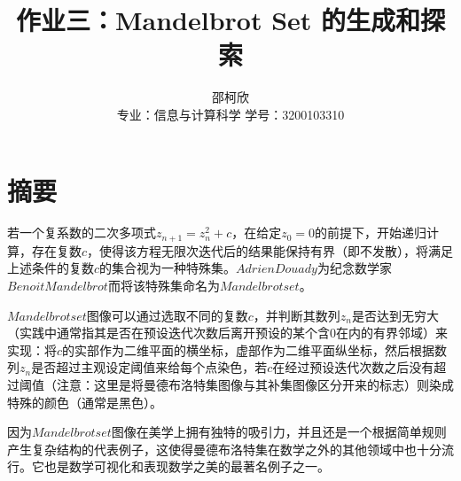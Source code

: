 \documentclass{ctexart}
\title{作业三：Mandelbrot Set 的生成和探索}
\author{邵柯欣 \\ 专业：信息与计算科学 学号：3200103310}
\begin{document}
\maketitle

\section{摘要}

若一个复系数的二次多项式$z_{n+1}=z_n^2+c$，在给定$z_0=0$的前提下，开始递归计算，存在复数$c$，使得该方程无限次迭代后的结果能保持有界（即不发散），将满足上述条件的复数${c}$的集合视为一种特殊集。$Adrien Douady$为纪念数学家$Benoit Mandelbrot$而将该特殊集命名为$Mandelbrot set$。

$Mandelbrot set$图像可以通过选取不同的复数$c$，并判断其数列${z_n}$是否达到无穷大（实践中通常指其是否在预设迭代次数后离开预设的某个含0在内的有界邻域）来实现：将$c$的实部作为二维平面的横坐标，虚部作为二维平面纵坐标，然后根据数列${z_n}$是否超过主观设定阈值来给每个点染色，若$ c $在经过预设迭代次数之后没有超过阈值（注意：这里是将曼德布洛特集图像与其补集图像区分开来的标志）则染成特殊的颜色（通常是黑色）。

因为$Mandelbrot set$图像在美学上拥有独特的吸引力，并且还是一个根据简单规则产生复杂结构的代表例子，这使得曼德布洛特集在数学之外的其他领域中也十分流行。它也是数学可视化和表现数学之美的最著名例子之一。 
\end{document}
